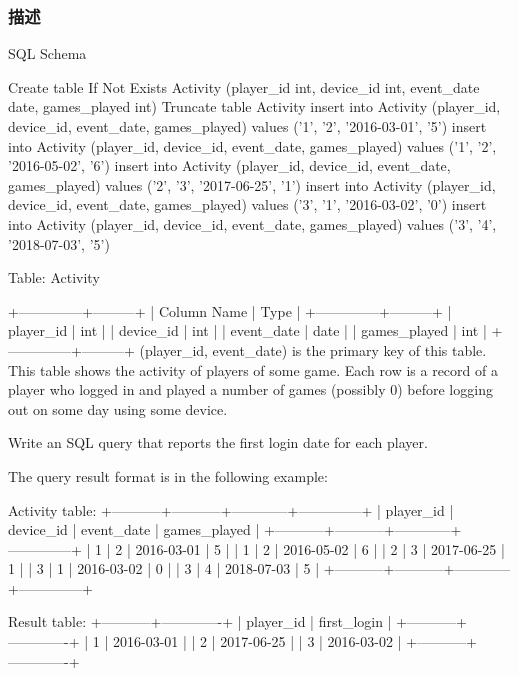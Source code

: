 \subsubsection{描述}
SQL Schema

\begin{Code}
Create table If Not Exists Activity (player_id int, device_id int, event_date date, games_played int)
Truncate table Activity
insert into Activity (player_id, device_id, event_date, games_played) values ('1', '2', '2016-03-01', '5')
insert into Activity (player_id, device_id, event_date, games_played) values ('1', '2', '2016-05-02', '6')
insert into Activity (player_id, device_id, event_date, games_played) values ('2', '3', '2017-06-25', '1')
insert into Activity (player_id, device_id, event_date, games_played) values ('3', '1', '2016-03-02', '0')
insert into Activity (player_id, device_id, event_date, games_played) values ('3', '4', '2018-07-03', '5')
\end{Code}

Table: Activity

\begin{Code}
+--------------+---------+
| Column Name  | Type    |
+--------------+---------+
| player_id    | int     |
| device_id    | int     |
| event_date   | date    |
| games_played | int     |
+--------------+---------+
(player_id, event_date) is the primary key of this table.
This table shows the activity of players of some game.
Each row is a record of a player who logged in and played a number of games (possibly 0) before logging out on some day using some device.
\end{Code}

Write an SQL query that reports the first login date for each player.

The query result format is in the following example:

\begin{Code}
Activity table:
+-----------+-----------+------------+--------------+
| player_id | device_id | event_date | games_played |
+-----------+-----------+------------+--------------+
| 1         | 2         | 2016-03-01 | 5            |
| 1         | 2         | 2016-05-02 | 6            |
| 2         | 3         | 2017-06-25 | 1            |
| 3         | 1         | 2016-03-02 | 0            |
| 3         | 4         | 2018-07-03 | 5            |
+-----------+-----------+------------+--------------+

Result table:
+-----------+-------------+
| player_id | first_login |
+-----------+-------------+
| 1         | 2016-03-01  |
| 2         | 2017-06-25  |
| 3         | 2016-03-02  |
+-----------+-------------+
\end{Code}


